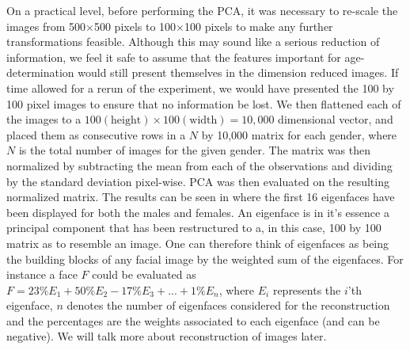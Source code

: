On a practical level, before performing the PCA, it was necessary to re-scale the images from 500$\times$500 pixels to 100$\times$100 pixels to make any further transformations feasible. Although this may sound like a serious reduction of information, we feel it safe to assume that the features important for age-determination would still present themselves in the dimension reduced images. If time allowed for a rerun of the experiment, we would have presented the 100 by 100 pixel images to ensure that no information be lost. We then flattened each of the images to a $100 \mathrm{(height)} \times 100 \mathrm{(width)} = 10,000$ dimensional vector, and placed them as consecutive rows in a $N$ by 10,000 matrix for each gender, where $N$ is the total number of images for the given gender. The matrix was then normalized by subtracting the mean from each of the observations and dividing by the standard deviation pixel-wise. PCA was then evaluated on the resulting normalized matrix. The results can be seen in  where the first 16 eigenfaces have been displayed for both the males and females. An eigenface is in it's essence a principal component that has been restructured to a, in this case, 100 by 100 matrix as to resemble an image. One can therefore think of eigenfaces as being the building blocks of any facial image by the weighted sum of the eigenfaces. For instance a face $F$ could be evaluated as $F = 23\%E_1 + 50\%E_2 - 17\%E_3 + ... + 1\%E_n$, where $E_i$ represents the $i$'th eigenface, $n$ denotes the number of eigenfaces considered for the reconstruction and the percentages are the weights associated to each eigenface (and can be negative). We will talk more about reconstruction of images later.

